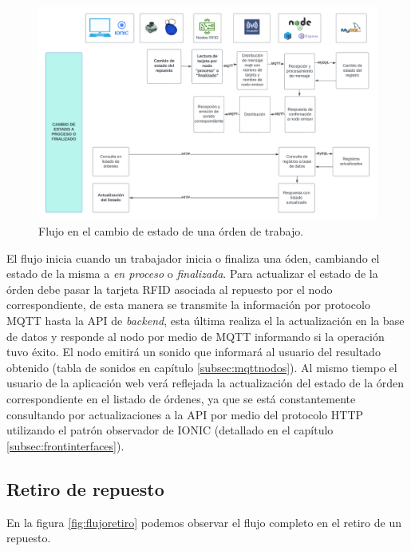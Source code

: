 \begin{figure}[ht]
	\centering
	\includegraphics[scale=.10]{./Figures/flujo-cambio-estado.png}
	\caption{Flujo en el cambio de estado de una órden de trabajo.}
	\label{fig:flujocambioestado}
\end{figure}

El flujo inicia cuando un trabajador inicia o finaliza una óden, cambiando el estado de la misma a \textit{en proceso} o \textit{finalizada}. Para actualizar el estado de la órden debe pasar la tarjeta RFID asociada al repuesto por el nodo correspondiente, de esta manera se transmite la información por protocolo MQTT hasta la API de \textit{backend}, esta última realiza el la actualización en la base de datos y responde al nodo por medio de MQTT informando si la operación tuvo éxito. El nodo emitirá un sonido que informará al usuario del resultado obtenido (tabla de sonidos en capítulo \ref{subsec:mqttnodos}). Al mismo tiempo el usuario de la aplicación web verá reflejada la actualización del estado de la órden correspondiente en el listado de órdenes, ya que se está constantemente consultando por actualizaciones a la API por medio del protocolo HTTP utilizando el patrón observador de IONIC (detallado en el capítulo \ref{subsec:frontinterfaces}).

\subsection{Retiro de repuesto}
\label{subsec:flujoretiro}

En la figura \ref{fig:flujoretiro} podemos observar el flujo completo en el retiro de un repuesto.

